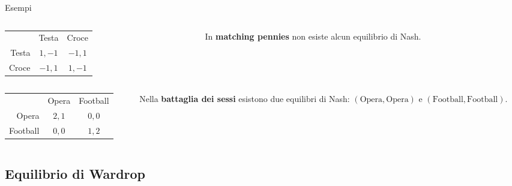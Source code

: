 \documentclass{beamer}
\theoremstyle{plain}
\theoremstyle{definition}
\theoremstyle{remark}
\newcommand{\pa}[1]{\left(#1\right)}
\begin{document}
\begin{frame}{Esempi}
  \begin{columns}[T]
    \begin{column}{0.45\textwidth}
      \begin{tabular}{rcc}
        & Testa & Croce \\
        \cline{2-3}
        Testa & \multicolumn{1}{|c|}{$1,-1$} & \multicolumn{1}{|c|}{$-1,1$}  \\
        \cline{2-3}
        Croce & \multicolumn{1}{|c|}{$-1,1$} & \multicolumn{1}{|c|}{$1,-1$}  \\
        \cline{2-3}
      \end{tabular}
    \end{column}
    \begin{column}{0.45\textwidth}
      In \textbf{matching pennies} non esiste alcun equilibrio di Nash.
    \end{column}
  \end{columns}
  \vfill
  
  \begin{columns}[T]
    \begin{column}{0.45\textwidth}
      \begin{tabular}{rcc}
        & Opera & Football \\
        \cline{2-3}
        Opera & \multicolumn{1}{|c|}{$2,1$} & \multicolumn{1}{|c|}{$0,0$}  \\
        \cline{2-3}
        Football & \multicolumn{1}{|c|}{$0,0$} & \multicolumn{1}{|c|}{$1,2$}  \\
        \cline{2-3}
      \end{tabular}
    \end{column}
    \begin{column}{0.45\textwidth}
      Nella \textbf{battaglia dei sessi} esistono due equilibri di
      Nash: $\pa{\text{Opera},\text{Opera}}$ e
      $\pa{\text{Football},\text{Football}}$.
    \end{column}
  \end{columns}
\end{frame}

\subsection{Equilibrio di Wardrop}
\end{document}

